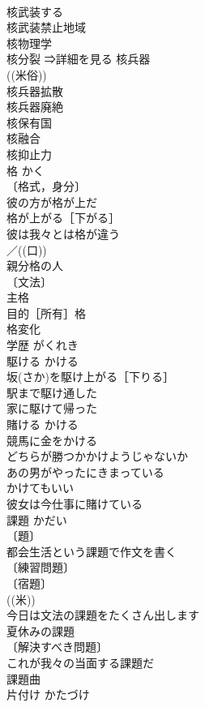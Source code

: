 \documentclass[8pt]{extreport}
\begin{document}
\begin{CJK}{UTF8}{min}
\\	核武装する 
\\	核武装禁止地域 
\\	核物理学 
\\	核分裂 ⇒詳細を見る 核兵器 
\\	((米俗)) 
\\	核兵器拡散 
\\	核兵器廃絶 
\\	核保有国 
\\	核融合 
\\	核抑止力 
\\	格	かく	
\\	〔格式，身分〕
\\	彼の方が格が上だ 
\\	格が上がる［下がる］ 
\\	彼は我々とは格が違う 
\\	／((口)) 
\\	親分格の人 
\\	〔文法〕
\\	主格 
\\	目的［所有］格 
\\	格変化 
\\	学歴	がくれき	
\\	駆ける	かける	
\\	坂(さか)を駆け上がる［下りる］ 
\\	駅まで駆け通した 
\\	家に駆けて帰った 
\\	賭ける	かける	
\\	競馬に金をかける 
\\	どちらが勝つかかけようじゃないか 
\\	あの男がやったにきまっている
\\	かけてもいい 
\\	彼女は今仕事に賭けている 
\\	課題	かだい	
\\	〔題〕
\\	都会生活という課題で作文を書く 
\\	〔練習問題〕
\\	〔宿題〕
\\	((米)) 
\\	今日は文法の課題をたくさん出します 
\\	夏休みの課題 
\\	〔解決すべき問題〕
\\	これが我々の当面する課題だ 
\\	課題曲 
\\	片付け	かたづけ	

\end{CJK}
\end{document}
